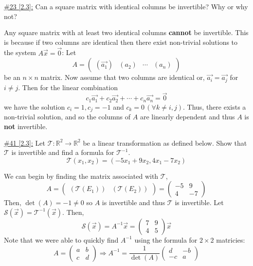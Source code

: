 \documentclass{exam}
\newcommand{\RR}{\mathbb R}
\begin{document}
\underline{\#23 [2.3]:} Can a square matrix with identical columns be invertible? Why or why not?
\begin{solution}
    Any square matrix with at least two identical columns \textbf{cannot} be invertible. This is because if two columns are identical then there exist non-trivial solutions to the system $A\vec{x}=\vec{0}$: Let 
    \[
        A = \begin{pmatrix}
            \left(\vec{a_1}\right) & \left(a_2\right) & \cdots & \left(a_n\right)
        \end{pmatrix} 
    \]
    be an $n \times n$ matrix. Now assume that two columns are identical or, $\vec{a_i} = \vec{a_j}$ for $i \neq j$. Then for the linear combination 
    \[
        c_1\vec{a_1} + c_2\vec{a_2} + \cdots + c_n\vec{a_n} = \vec{0}
    \]
    we have the solution $c_i = 1, c_j=-1$ and $c_k=0\,(\forall k \neq i, j)$. Thus, there exists a non-trivial solution, and so the columns of $A$ are linearly dependent and thus $A$ is \textbf{not} invertible.
\end{solution}

\underline{\#41 [2.3]:} Let $\mathcal{T}:\RR^{2} \to \RR^{2}$ be a linear transformation as defined below. Show that $\mathcal{T}$ is invertible and find a formula for $\mathcal{T}^{-1}$. 
\[
    \mathcal{T}\left(x_1, x_2\right) = \left(-5x_1 + 9x_2, 4x_1 - 7x_2\right)
\]
\begin{solution}
    We can begin by finding the matrix associated with $\mathcal{T}$, 
    \[
        A = \begin{pmatrix}
            \left(\mathcal{T}\left(E_1\right)\right) & \left(\mathcal{T}\left(E_2\right)\right)
        \end{pmatrix} 
        = 
        \begin{pmatrix}
            -5 & 9 \\ 4 & -7
        \end{pmatrix}
    \]
    Then, $\det\left(A\right) = -1 \neq 0$ so $A$ is invertible and thus $\mathcal{T}$ is invertible. Let $\mathcal{S}\left(\vec{x}\right) = \mathcal{T}^{-1}\left(\vec{x}\right)$. Then, 
    \[
        \mathcal{S}\left(\vec{x}\right) = A^{-1}\vec{x} = 
        \begin{pmatrix}
            7 & 9 \\ 4 & 5
        \end{pmatrix}\vec{x}
    \]
    Note that we were able to quickly find $A^{-1}$ using the formula for $2 \times 2$ matricies: 
    \[
        A = \begin{pmatrix}
            a & b \\ c & d 
        \end{pmatrix}
        \Rightarrow
        A^{-1} = \frac{1}{\det\left(A\right)}\begin{pmatrix}
            d & -b \\ -c & a
        \end{pmatrix}
    \]
\end{solution}
\end{document}
